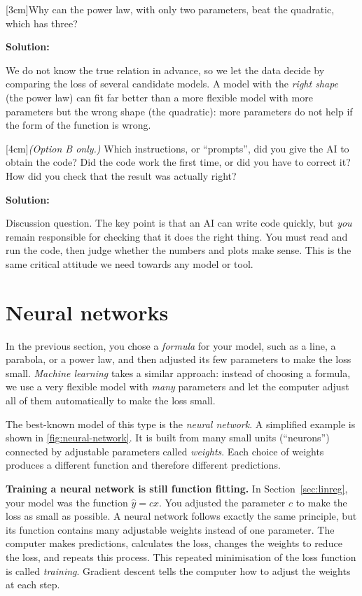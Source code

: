 \documentclass[12pt]{article}
\makeatletter
\newcounter{question}
\newlength\questionheight
\newcommand{\question}{\@ifstar{\question@text}{\question@field}}
\newcommand{\question@heading}[1]{%
  \refstepcounter{question}%
  \vspace{0.3cm}%
  \noindent\textbf{\faEdit\ Question \thequestion: #1}%
}
\newcommand{\question@text}[1]{%
  \question@heading{#1}%
}
\newcommand{\question@field}[2][\questionheight]{%
  \question@heading{#2}%
 \\[0.3em] \begin{Form}
    \TextField[
      name=Q\thequestion,
      multiline=true,
      width=\linewidth,
      height=#1,
      charsize=10pt,
      bordercolor={0 0 0},
      borderwidth=1.8,
      backgroundcolor={1 1 1}
    ]{}
  \end{Form}
  \vspace{0.3cm}%
}
\newenvironment{solution}{%
  \begin{solutionbox}\textbf{Solution:}
}{%
  \end{solutionbox}
}
\makeatother
\begin{document}
\question[3cm]{Why can the power law, with only two parameters, beat the quadratic, which has three?}

\begin{solution}
We do not know the true relation in advance, so we let the data decide by comparing the loss of several candidate models. A model with the \emph{right shape} (the power law) can fit far better than a more flexible model with more parameters but the wrong shape (the quadratic): more parameters do not help if the form of the function is wrong.
\end{solution}

\question[4cm]{\emph{(Option B only.)} Which instructions, or ``prompts'', did you give the AI to obtain the code? Did the code work the first time, or did you have to correct it? How did you check that the result was actually right?}

\begin{solution}
Discussion question. The key point is that an AI can write code quickly, but \emph{you} remain responsible for checking that it does the right thing. You must read and run the code, then judge whether the numbers and plots make sense. This is the same critical attitude we need towards any model or tool.
\end{solution}

\section{Neural networks}\label{sec:nn}

In the previous section, you chose a \emph{formula} for your model, such as a line, a parabola, or a power law, and then adjusted its few parameters to make the loss small. \emph{Machine learning} takes a similar approach: instead of choosing a formula, we use a very flexible model with \emph{many} parameters and let the computer adjust all of them automatically to make the loss small.

The best-known model of this type is the \emph{neural network}. A simplified example is shown in \cref{fig:neural-network}. It is built from many small units (``neurons'') connected by adjustable parameters called \emph{weights}. Each choice of weights produces a different function and therefore different predictions.

\begin{importantbox}
\textbf{Training a neural network is still function fitting.} In Section~\ref{sec:linreg}, your model was the function $\hat{y}=cx$. You adjusted the parameter $c$ to make the loss as small as possible. A neural network follows exactly the same principle, but its function contains many adjustable weights instead of one parameter. The computer makes predictions, calculates the loss, changes the weights to reduce the loss, and repeats this process. This repeated minimisation of the loss function is called \emph{training}. Gradient descent tells the computer how to adjust the weights at each step.
\end{importantbox}
\end{document}
